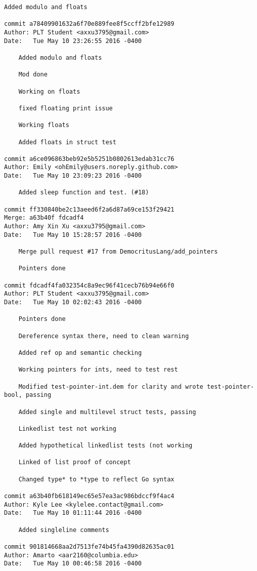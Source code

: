 \begin{lstlisting}[backgroundcolor=\color{white}]
    Added modulo and floats

commit a78409901632a6f70e889fee8f5ccff2bfe12989
Author: PLT Student <axxu3795@gmail.com>
Date:   Tue May 10 23:26:55 2016 -0400

    Added modulo and floats
    
    Mod done
    
    Working on floats
    
    fixed floating print issue
    
    Working floats
    
    Added floats in struct test

commit a6ce096863beb92e5b5251b0802613edab31cc76
Author: Emily <ohEmily@users.noreply.github.com>
Date:   Tue May 10 23:09:23 2016 -0400

    Added sleep function and test. (#18)

commit ff330840be2c13aeed6f2a6d87a69ce153f29421
Merge: a63b40f fdcadf4
Author: Amy Xin Xu <axxu3795@gmail.com>
Date:   Tue May 10 15:28:57 2016 -0400

    Merge pull request #17 from DemocritusLang/add_pointers
    
    Pointers done

commit fdcadf4fa032354c8a9ec96f41cecb76b94e66f0
Author: PLT Student <axxu3795@gmail.com>
Date:   Tue May 10 02:02:43 2016 -0400

    Pointers done
    
    Dereference syntax there, need to clean warning
    
    Added ref op and semantic checking
    
    Working pointers for ints, need to test rest
    
    Modified test-pointer-int.dem for clarity and wrote test-pointer-bool, passing
    
    Added single and multilevel struct tests, passing
    
    Linkedlist test not working
    
    Added hypothetical linkedlist tests (not working
    
    Linked of list proof of concept
    
    Changed type* to *type to reflect Go syntax

commit a63b40fb618149ec65e57ea3ac986bdccf9f4ac4
Author: Kyle Lee <kylelee.contact@gmail.com>
Date:   Tue May 10 01:11:44 2016 -0400

    Added singleline comments

commit 901814668aa2d7513fe74b45fa4390d82635ac01
Author: Amarto <aar2160@columbia.edu>
Date:   Tue May 10 00:46:58 2016 -0400


\end{lstlisting}

